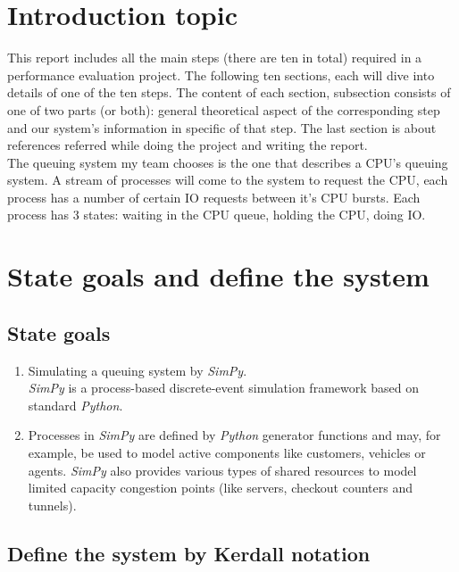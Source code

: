 \documentclass[13pt,a4paper]{article}
\begin{document}
	
	\newpage
	\tableofcontents
	\newpage
	\section{Introduction topic}
		This report includes all the main steps (there are ten in total) required in a performance evaluation project. The following ten sections, each will dive into details of one of the ten steps. The content of each section, subsection consists of one of two parts (or both): general theoretical aspect of the corresponding step and our system’s information in specific of that step. The last section is about references referred while doing the project and writing the report.\\
		The queuing system my team chooses is the one that describes a CPU’s queuing system.  A stream of processes will come to the system to request the CPU, each process has a number of certain IO requests between it’s CPU bursts. Each process has 3 states: waiting in the CPU queue, holding the CPU, doing IO.
	\section{State goals and define the system}
		\subsection{State goals}
			\begin{enumerate}[-]
				\item Simulating a queuing system by \textit{SimPy}.\\
					  \textit{SimPy} is a process-based discrete-event simulation framework based on standard \textit{Python}.
				\item Processes in \textit{SimPy} are defined by \textit{Python} generator functions and may, for example, be used to model active components like customers, vehicles or agents. \textit{SimPy} also provides various types of shared resources to model limited capacity congestion points (like servers, checkout counters and tunnels).
			\end{enumerate}
		\subsection{Define the system by Kerdall notation}
\end{document}
